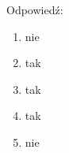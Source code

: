 Odpowiedź:
\begin{enumerate}
	\item nie
	\item tak
	\item tak
	\item tak
	\item nie
\end{enumerate}
